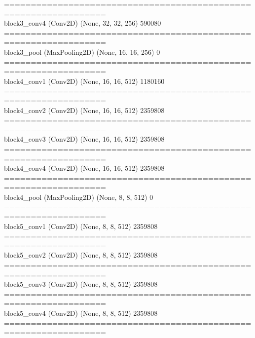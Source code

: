 \documentclass{article}
\begin{document}
{\begin{minipage}{\textwidth}
        ================================================================= \\ 
        block3\_conv4 (Conv2D)        (None, 32, 32, 256)       590080 \\ 
        ================================================================= \\ 
        block3\_pool (MaxPooling2D)   (None, 16, 16, 256)       0 \\ 
        ================================================================= \\ 
        block4\_conv1 (Conv2D)        (None, 16, 16, 512)       1180160 \\ 
        ================================================================= \\ 
        block4\_conv2 (Conv2D)        (None, 16, 16, 512)       2359808 \\ 
        ================================================================= \\ 
        block4\_conv3 (Conv2D)        (None, 16, 16, 512)       2359808 \\ 
        ================================================================= \\ 
        block4\_conv4 (Conv2D)        (None, 16, 16, 512)       2359808 \\ 
        ================================================================= \\ 
        block4\_pool (MaxPooling2D)   (None, 8, 8, 512)         0 \\ 
        ================================================================= \\ 
        block5\_conv1 (Conv2D)        (None, 8, 8, 512)         2359808 \\ 
        ================================================================= \\ 
        block5\_conv2 (Conv2D)        (None, 8, 8, 512)         2359808 \\ 
        ================================================================= \\ 
        block5\_conv3 (Conv2D)        (None, 8, 8, 512)         2359808 \\ 
        ================================================================= \\ 
        block5\_conv4 (Conv2D)        (None, 8, 8, 512)         2359808 \\ 
        ================================================================= \\ 

\end{minipage}}
\end{document}
